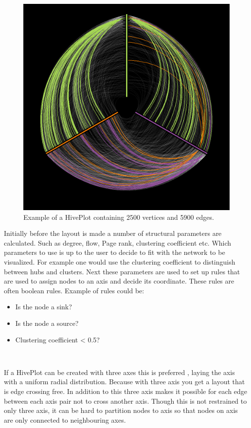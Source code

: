 \documentclass[a4paper,11pt]{kth-mag}
\begin{document}
\begin{figure}[!htbp]
	\centering
	\includegraphics[scale=0.5]{hiveplotEx1}
	\caption{Example of a HivePlot containing 2500 vertices and 5900 edges.}
	\label{fig:hive_plot}
\end{figure}

Initially before the layout is made a number of structural parameters are calculated. Such as degree, flow, Page rank, clustering coefficient etc. Which parameters to use is up to the user to decide to fit with the network to be
visualized. For example one would use the clustering coefficient to distinguish between hubs and clusters. Next these parameters are used to set up rules that are used to assign nodes to an axis and decide its coordinate. These rules
are often boolean rules. Example of rules could be: \
\begin{itemize}
	\item{Is the node a sink?}
	\item{Is the node a source?}
	\item{Clustering coefficient < 0.5?}
\end{itemize}
\

If a HivePlot can be created with three axes this is preferred \cite{Krzywinski01092012}, laying the axis with a uniform radial distribution. Because with three axis you get a layout that is edge crossing free. In addition to this 
three axis makes it possible for each edge between each axis pair not to cross another axis. Though this is not restrained to only three axis, it can be hard to partition nodes to axis so that nodes on axis are only connected
to neighbouring axes.
\end{document}
